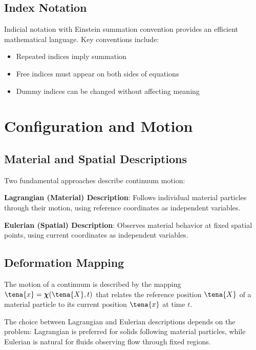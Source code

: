 \subsection{Index Notation}

Indicial notation with Einstein summation convention provides an efficient mathematical language. Key conventions include:
\begin{itemize}
\item Repeated indices imply summation
\item Free indices must appear on both sides of equations
\item Dummy indices can be changed without affecting meaning
\end{itemize}

\section{Configuration and Motion}

\subsection{Material and Spatial Descriptions}

Two fundamental approaches describe continuum motion:

\textbf{Lagrangian (Material) Description}: Follows individual material particles through their motion, using reference coordinates as independent variables.

\textbf{Eulerian (Spatial) Description}: Observes material behavior at fixed spatial points, using current coordinates as independent variables.

\subsection{Deformation Mapping}

The motion of a continuum is described by the mapping $\tena{x} = \boldsymbol{\chi}(\tena{X}, t)$ that relates the reference position $\tena{X}$ of a material particle to its current position $\tena{x}$ at time $t$.

\begin{keypoint}
The choice between Lagrangian and Eulerian descriptions depends on the problem: Lagrangian is preferred for solids following material particles, while Eulerian is natural for fluids observing flow through fixed regions.
\end{keypoint}


